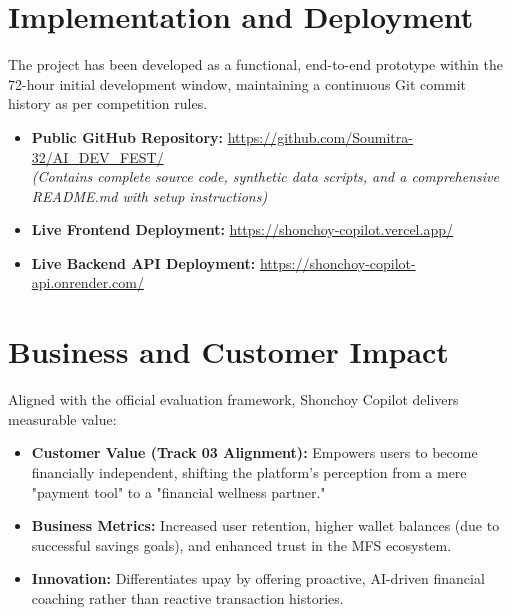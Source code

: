 \documentclass[11pt, a4paper]{article}
\begin{document}
\newpage

\section{Implementation and Deployment}
The project has been developed as a functional, end-to-end prototype within the 72-hour initial development window, maintaining a continuous Git commit history as per competition rules.

\begin{itemize}[leftmargin=*]
    \item \textbf{Public GitHub Repository:} \url{https://github.com/Soumitra-32/AI_DEV_FEST/} \\
    \textit{(Contains complete source code, synthetic data scripts, and a comprehensive README.md with setup instructions)}
    \item \textbf{Live Frontend Deployment:} \url{https://shonchoy-copilot.vercel.app/}
    \item \textbf{Live Backend API Deployment:} \url{https://shonchoy-copilot-api.onrender.com/}
\end{itemize}

\newpage

\section{Business and Customer Impact}
Aligned with the official evaluation framework, Shonchoy Copilot delivers measurable value:
\begin{itemize}[leftmargin=*]
    \item \textbf{Customer Value (Track 03 Alignment):} Empowers users to become financially independent, shifting the platform's perception from a mere "payment tool" to a "financial wellness partner."
    \item \textbf{Business Metrics:} Increased user retention, higher wallet balances (due to successful savings goals), and enhanced trust in the MFS ecosystem.
    \item \textbf{Innovation:} Differentiates upay by offering proactive, AI-driven financial coaching rather than reactive transaction histories.
\end{itemize}

\newpage

\end{document}
